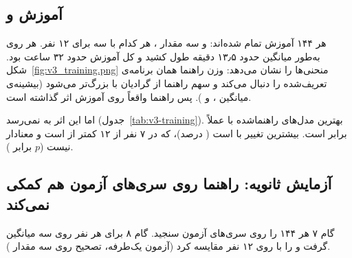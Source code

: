 \begin{table}[htbp]
\centering\small
\caption{میانه‌ی قدرمطلق خطای زمان شروع فعالیت (میلی‌ثانیه)، روی همه‌ی ها و عضله‌ها.}
\label{tab:v3-onset}

\end{table}


\subsection{آموزش  و }
\label{sec:v3-training}

هر ۱۴۴  آموزش تمام شده‌اند:  و سه مقدار ، هر کدام با سه  برای ۱۲ نفر. هر  روی  به‌طور میانگین حدود ۱۳٫۵ دقیقه طول کشید و کل آموزش حدود ۳۲ ساعت  بود. شکل~\ref{fig:v3_training.png} منحنی‌ها را نشان می‌دهد: وزن راهنما همان برنامه‌ی تعریف‌شده را دنبال می‌کند و سهم راهنما از گرادیان با  بزرگ‌تر می‌شود (بیشینه‌ی میانگین ،  و ). پس راهنما واقعاً روی آموزش اثر گذاشته است.

اما این اثر به   نمی‌رسد (جدول~\ref{tab:v3-training}). بهترین   مدل‌های راهنماشده با  عملاً برابر است. بیشترین تغییر با   است ( درصد)، که در ۷ نفر از ۱۲ کمتر از  است و معنادار نیست ($p$ برابر ).

\begin{table}[htbp]
\centering\small
\caption{آموزش  و : میانگین روی ۳۶  هر مدل. تغییر  و مقایسه با  روی میانگین سه  هر نفر است؛ $p$ از آزمون  یک‌طرفه (کمتر بودن ).}
\label{tab:v3-training}
\resizebox{\textwidth}{!}{}
\end{table}


\subsection{آزمایش ثانویه: راهنما روی سری‌های آزمون هم کمکی نمی‌کند}
\label{sec:v3-pending}

گام ۷ هر ۱۴۴  را روی سری‌های آزمون سنجید. گام ۸ برای هر نفر روی سه  میانگین گرفت و  را با  روی ۱۲ نفر مقایسه کرد (آزمون  یک‌طرفه، تصحیح  روی سه مقدار ).

